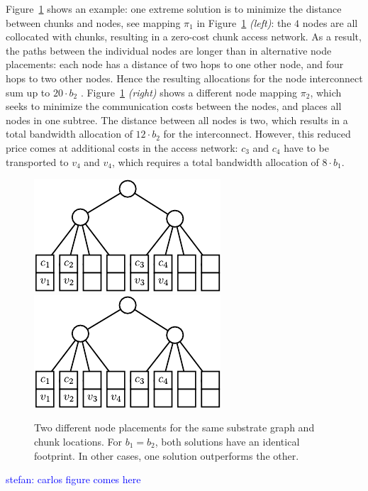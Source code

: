 \documentclass[9pt]{sigcomm-alternate}
\newcommand{\stefan}[1]{\textcolor{blue}{stefan: #1}}
\newcommand{\NodeMapping}{\pi}
\newcommand{\CostTrans}{\ensuremath{b_1}}
\newcommand{\CostCom}{\ensuremath{b_2}}
\begin{document}
Figure~\ref{fig:dynamic_motivation} shows an example: one
extreme solution is to minimize the distance between chunks and nodes,
see mapping $\NodeMapping_1$ in
Figure~\ref{fig:dynamic_motivation} \emph{(left)}: the $4$ nodes are all
collocated with chunks, resulting in a zero-cost chunk access network. As a
result, the paths between the individual nodes are longer than in alternative
node placements: each node has a distance of two hops to one other node,
and four hops to two other nodes. Hence the resulting allocations for the
node interconnect sum up to $20 \cdot \CostCom$ . 
Figure~\ref{fig:dynamic_motivation} \emph{(right)} shows a different node
mapping $\NodeMapping_2$, which seeks to minimize the communication costs
between the nodes, and places all nodes in one subtree. The distance between all
nodes is two, which results in a total bandwidth allocation of $12\cdot\CostCom$
for the interconnect. However, this reduced price comes at additional costs in
the access network: $c_3$ and $c_4$ have to be transported to $v_4$ and $v_4$,
which requires a total bandwidth allocation of $8 \cdot \CostTrans$. 


\begin{figure}
\includegraphics[width = 0.49\columnwidth]{figs/dynamic_bad}
\hfill
\includegraphics[width = 0.49\columnwidth]{figs/dynamic_good}
\caption{Two different node placements for the same substrate graph and chunk
locations. For $\CostTrans = \CostCom$, both solutions have an identical
footprint. In other cases, one solution outperforms the other.}
\label{fig:dynamic_motivation}
\end{figure}

\stefan{carlos figure comes here}
\end{document}
